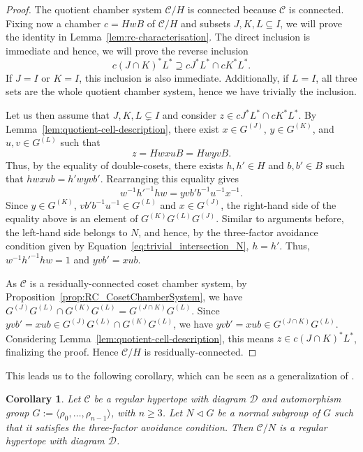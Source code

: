 \documentclass[10pt,a4paper]{amsart}
\newtheorem{coro}[prop]{Corollary}
\newcommand{\CC}{\mathcal{C}}
\newcommand{\D}{\mathcal{D}}
\newcommand{\C}{\mathcal{C}}
\begin{document}
\begin{proof}
The quotient chamber system $\C/H$ is connected because $\C$ is connected.  Fixing now a chamber
$c=HwB$ of $\CC/H$ and subsets $J,K,L\subseteq I$,  we will prove the identity in
Lemma~\ref{lem:rc-characterisation}.
The direct inclusion is immediate and hence, we will prove the reverse inclusion
\[
    c(J\cap K)^*L^*\supseteq cJ^*L^*\cap cK^*L^*.
\]
 If $J=I$ or $K=I$, this inclusion is also immediate.  Additionally, if
$L=I$, all three sets are the whole quotient chamber system, hence we have trivially the inclusion. 

Let us then assume that $J,K,L\subsetneq I$ and consider $z\in cJ^*L^*\cap cK^*L^*$.  By
Lemma~\ref{lem:quotient-cell-description}, there exist
$x\in G^{(J)}$, $y\in G^{(K)}$, and $u,v\in G^{(L)}$
such that
\[
    z=HwxuB=HwyvB.
\]
Thus, by the equality of double-cosets, there exists $h,h'\in H$ and $b,b'\in B$ such that
$hwxub=h'wyvb'.$
Rearranging this equality gives
\begin{equation*}
    w^{-1}h'^{-1}hw=yvb'b^{-1}u^{-1}x^{-1}.
\end{equation*}
Since $y\in G^{(K)}$, $vb'b^{-1}u^{-1}\in G^{(L)}$ and $x\in G^{(J)}$, the right-hand side of the 
equality above is an element of
$G^{(K)}G^{(L)}G^{(J)}$. Similar to arguments before, the left-hand side belongs to $N$, and hence, by the three-factor avoidance condition given by Equation~\eqref{eq:trivial_intersection_N},
$h=h'$. Thus, $w^{-1}h'^{-1}hw=1$ and $yvb'= xub$.

As $\C$ is a residually-connected coset chamber system, by Proposition~\ref{prop:RC_CosetChamberSystem}, we have $G^{(J)}G^{(L)} \cap G^{(K)}G^{(L)} =G^{(J\cap K)}G^{(L)}$. Since $yvb'=xub\in G^{(J)}G^{(L)} \cap G^{(K)}G^{(L)}$, we have $yvb'=xub\in G^{(J\cap K)}G^{(L)}$.
Considering Lemma~\ref{lem:quotient-cell-description}, this means $z\in c(J\cap K)^*L^*$, finalizing the proof.
Hence $\CC/H$ is
residually-connected.
\end{proof}




This leads us to the following corollary, which can be seen as a generalization of \cite[Theorem 3.2]{fernandes2020exploration}.
\begin{coro}
Let $\C$ be a regular hypertope with diagram $\D$ and automorphism group $G := \langle \rho_0,\ldots,\rho_{n-1}\rangle$, with $n\geq 3$. Let $N\triangleleft G$ be a normal subgroup of $G$ such that it satisfies the three-factor avoidance condition. Then $\C/N$ is a regular hypertope with diagram $\D$.
\end{coro}
\end{document}
